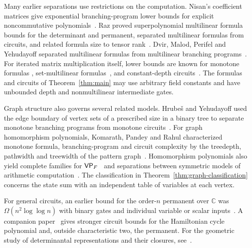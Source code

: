 Many earlier separations use restrictions on the computation. Nisan's
coefficient matrices give exponential branching-program lower bounds
for explicit noncommutative polynomials~\cite{Nisan}. Raz proved
superpolynomial multilinear formula bounds for the determinant and
permanent, separated multilinear formulas from circuits, and related
formula size to tensor rank~\cite{RazMultilinear,RazFormula,RazRank}.
Dvir, Malod, Perifel and Yehudayoff separated multilinear formulas
from multilinear branching programs~\cite{DMPY}. For iterated matrix
multiplication itself, lower bounds are known for monotone formulas
\cite{Snir}, set-multilinear formulas~\cite{LST}, and constant-depth
circuits~\cite{LstDepth,Forbes,BDS}. The formulas and circuits of
Theorem~\ref{thm:main} may use arbitrary field constants and have
unbounded depth and nonmultilinear intermediate gates.

Graph structure also governs several related models. Hrube\v{s} and
Yehudayoff used the edge boundary of vertex sets of a prescribed size
in a binary tree to separate monotone branching programs from monotone
circuits~\cite{HrubesYehudayoff}. For graph homomorphism polynomials,
Komarath, Pandey and Rahul characterized monotone formula,
branching-program and circuit complexity by the treedepth, pathwidth
and treewidth of the pattern graph~\cite{KPR}. Homomorphism polynomials
also yield complete families for $\mathsf{VP}_F$~\cite{Durand} and separations
between symmetric models of arithmetic computation~\cite{dw,DPS}.
The classification in Theorem~\ref{thm:graph-classification} concerns
the state sum with an independent table of variables at each vertex.

For general circuits, an earlier bound for the order-$n$ permanent over
$\mathbb C$ was $\Omega(n^2\log\log n)$ with binary gates and individual
variable or scalar inputs~\cite[Chapter~5]{TenAdvances}. A companion paper~\cite{oaP} gives stronger circuit
bounds for the Hamiltonian cycle polynomial and, outside characteristic
two, the permanent. For the geometric study of determinantal
representations and their closures, see~\cite{MS}.
